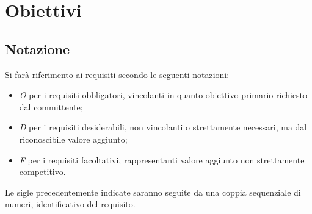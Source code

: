 \section*{Obiettivi}
\subsection*{Notazione}
Si farà riferimento ai requisiti secondo le seguenti notazioni:
\begin{itemize}
	\item \textit{O} per i requisiti obbligatori, vincolanti in quanto obiettivo primario richiesto dal committente;
	\item \textit{D} per i requisiti desiderabili, non vincolanti o strettamente necessari,
		  ma dal riconoscibile valore aggiunto;
	\item \textit{F} per i requisiti facoltativi, rappresentanti valore aggiunto non strettamente 
		  competitivo.
\end{itemize}

Le sigle precedentemente indicate saranno seguite da una coppia sequenziale di numeri, identificativo del requisito.

